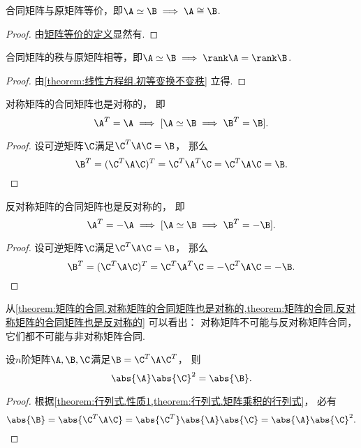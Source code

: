 \begin{property}
合同矩阵与原矩阵等价，即\(\A\simeq\B \implies \A\cong\B\).
\begin{proof}
由\hyperref[definition:逆矩阵.矩阵等价]{矩阵等价的定义}显然有.
\end{proof}
\end{property}

\begin{property}
合同矩阵的秩与原矩阵相等，即\(\A\simeq\B \implies \rank\A=\rank\B\).
\begin{proof}
由\cref{theorem:线性方程组.初等变换不变秩} 立得.
\end{proof}
\end{property}

\begin{proposition}\label{theorem:矩阵的合同.对称矩阵的合同矩阵也是对称的}
对称矩阵的合同矩阵也是对称的，
即\[
	\A^T = \A
	\implies
	[\A\simeq\B \implies \B^T = \B].
\]
\begin{proof}
设可逆矩阵\(\C\)满足\(\C^T\A\C=\B\)，
那么\[
	\B^T = (\C^T\A\C)^T = \C^T\A^T\C = \C^T\A\C = \B.
	\qedhere
\]
\end{proof}
\end{proposition}

\begin{proposition}\label{theorem:矩阵的合同.反对称矩阵的合同矩阵也是反对称的}
反对称矩阵的合同矩阵也是反对称的，
即\[
	\A^T = -\A
	\implies
	[\A\simeq\B \implies \B^T = -\B].
\]
\begin{proof}
设可逆矩阵\(\C\)满足\(\C^T\A\C=\B\)，
那么\[
	\B^T = (\C^T\A\C)^T = \C^T\A^T\C = -\C^T\A\C = -\B.
	\qedhere
\]
\end{proof}
\end{proposition}

\begin{remark}
从\cref{theorem:矩阵的合同.对称矩阵的合同矩阵也是对称的,theorem:矩阵的合同.反对称矩阵的合同矩阵也是反对称的}
可以看出：
对称矩阵不可能与反对称矩阵合同，
它们都不可能与非对称矩阵合同.
\end{remark}

\begin{proposition}\label{theorem:矩阵合同.合同矩阵的行列式的关系}
设\(n\)阶矩阵\(\A,\B,\C\)满足\(\B=\C^T\A\C^T\)，
则\[
	\abs{\A}\abs{\C}^2
	=\abs{\B}.
\]
\begin{proof}
根据\cref{theorem:行列式.性质1,theorem:行列式.矩阵乘积的行列式}，
必有\[
	\abs{\B}
	=\abs{\C^T\A\C}
	=\abs{\C^T}\abs{\A}\abs{\C}
	=\abs{\A}\abs{\C}^2.
	\qedhere
\]
\end{proof}
\end{proposition}


